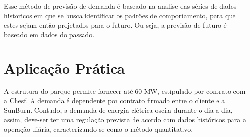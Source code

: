 Esse método de previsão de demanda é baseado na análise das séries de dados históricos em que se busca identificar os padrões de comportamento, para que estes sejam então projetados para o futuro. Ou seja, a previsão do futuro é baseado em dados do passado.

\section{Aplicação Prática}
\label{sec:introducao_ao_planejamento_aplicacao}
A estrutura do parque permite fornecer até 60 MW, estipulado por contrato com a Chesf. A demanda é dependente por contrato firmado entre o cliente e a SunBurn. Contudo, a demanda de energia elétrica oscila durante o dia a dia, assim, deve-ser ter uma regulação prevista de acordo com dados históricos para a operação diária, caracterizando-se como o método quantitativo.

